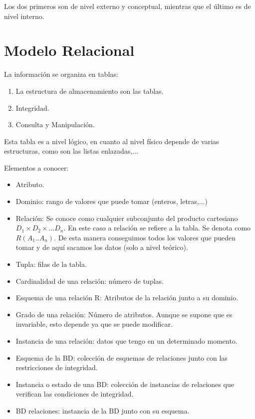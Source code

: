 Los dos primeros son de nivel externo y conceptual, mientras que el último es de nivel interno.

\section{Modelo Relacional}

La información se organiza en tablas: 

\begin{enumerate}
    \item La estructura de almacenamiento son las tablas.
    \item Integridad.
    \item Consulta y Manipulación.
\end{enumerate}

Esta tabla es a nivel lógico, en cuanto al nivel físico depende de varias estructuras, como son las listas enlazadas,...

Elementos a conocer:
\begin{itemize}
    \item Atributo.
    \item Dominio: rango de valores que puede tomar (enteros, letras,...)
    \item Relación: Se conoce como cualquier subconjunto del producto cartesiano $D_1 \times D_2 \times ... D_n$. En este caso a relación se refiere a la tabla. Se denota como $R(A_1..A_n)$. De esta manera conseguimos todos los valores que pueden tomar y de aquí sacamos los datos (solo a nivel teórico).
    \item Tupla: filas de la tabla.
    \item Cardinalidad de una relación: número de tuplas.
    \item Esquema de una relación R: Atributos de la relación junto a su dominio.
    \item Grado de una relación: Número de atributos. Aunque se supone que es invariable, esto depende ya que se puede modificar.
    \item Instancia de una relación: datos que tengo en un determinado momento.
    \item Esquema de la BD: colección de esquemas de relaciones junto con las restricciones de integridad.
    \item Instancia o estado de una BD: colección de instancias de relaciones que verifican las condiciones de integridad.
    \item BD relaciones: instancia de la BD junto con su esquema.
\end{itemize}
